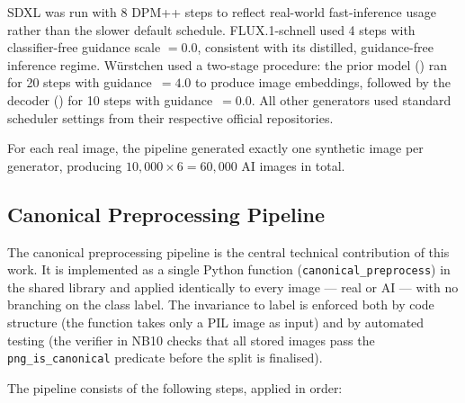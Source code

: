 SDXL was run with 8 DPM++ steps to reflect real-world fast-inference
usage rather than the slower default schedule.
FLUX.1-schnell used 4 steps with classifier-free guidance scale $= 0.0$,
consistent with its distilled, guidance-free inference regime.
W\"{u}rstchen used a two-stage procedure: the prior model
() ran for 20 steps with
guidance~$= 4.0$ to produce image embeddings, followed by the decoder
() for 10 steps with
guidance~$= 0.0$.
All other generators used standard scheduler settings from their
respective official repositories.

For each real image, the pipeline generated exactly one synthetic image
per generator, producing $10{,}000 \times 6 = 60{,}000$ AI images in total.

\subsection{Canonical Preprocessing Pipeline}
\label{ssec:preprocess}

The canonical preprocessing pipeline is the central technical
contribution of this work.
It is implemented as a single Python function
(\texttt{canonical\_preprocess}) in the shared library and applied
identically to every image — real or AI — with no branching on the
class label.
The invariance to label is enforced both by code structure
(the function takes only a PIL image as input) and by automated
testing (the verifier in NB10 checks that all stored images pass
the \texttt{png\_is\_canonical} predicate before the split is
finalised).

The pipeline consists of the following steps, applied in order:

